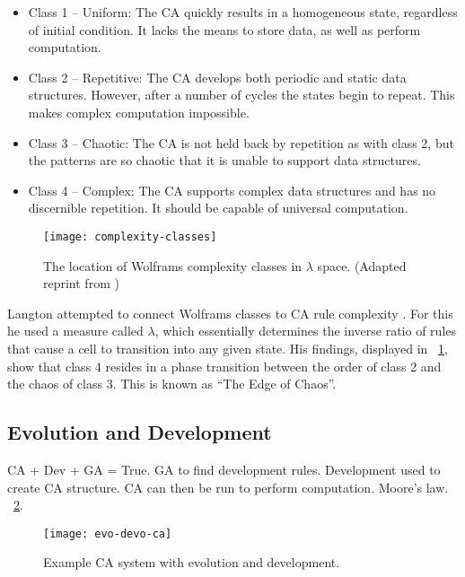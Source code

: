 \begin{itemize}
    \item Class 1 – Uniform:
        The CA quickly results in a homogeneous state, regardless of initial condition.
        It lacks the means to store data, as well as perform computation.
    \item Class 2 – Repetitive:
        The CA develops both periodic and static data structures.
        However, after a number of cycles the states begin to repeat.
        This makes complex computation impossible.
    \item Class 3 – Chaotic:
        The CA is not held back by repetition as with class 2, but the patterns are so chaotic that it is unable to support data structures.
    \item Class 4 – Complex:
        The CA supports complex data structures and has no discernible repetition.
        It should be capable of universal computation.
\end{itemize}

\begin{figure}[!ht]
    \centering
    \texttt{[image: complexity-classes]}
    \caption[Complexity classes]{
        The location of Wolframs complexity classes in $\lambda$ space.
        (Adapted reprint from \cite{langton1990edgeofchaos})
    }
    \label{fig:complexity-classes}
\end{figure}

Langton attempted to connect Wolframs classes to CA rule complexity \cite{langton1990edgeofchaos}.
For this he used a measure called $\lambda$, which essentially determines the inverse ratio of rules that cause a cell to transition into any given state.
His findings, displayed in \figurename~\ref{fig:complexity-classes}, show that class 4 resides in a phase transition between the order of class 2 and the chaos of class 3.
This is known as ``The Edge of Chaos''.

\subsection{Evolution and Development}

\TODO
CA + Dev + GA = True.
GA to find development rules.
Development used to create CA structure.
CA can then be run to perform computation.
Moore's law.
\figurename~\ref{fig:evo-devo-ca}.

\begin{figure}[!ht]
    \centering
    \texttt{[image: evo-devo-ca]}
    \caption[CA system with evolution and development]{
        Example CA system with evolution and development.
    }
    \label{fig:evo-devo-ca}
\end{figure}

